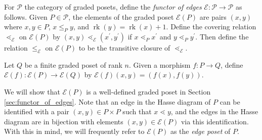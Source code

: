 \documentclass[smallextended, envcountsame, numbook]{svjour3}
\numberwithin{equation}{section}
\newcommand\rk{\operatorname{rk}}
\begin{document}
\begin{definition}
\label{defn:functor_of_edges}
For $\mathcal P$ the category of graded posets, define the {\it functor of edges} $\mathcal{E}\colon\mathcal{P} \rightarrow \mathcal{P}$ as follows. Given $P \in \mathcal P$, the elements of the graded poset $\mathcal{E}(P)$ are pairs $(x, y)$ where $x,y\in P$, $x\le_P y$, and $\rk(y) = \rk(x) + 1$. Define the covering relation $\lessdot_{\mathcal{E}}$ on $\mathcal{E}(P)$ by $(x, y) \lessdot_{\mathcal{E}} (x^\prime, y^\prime)$ if $x\lessdot_P x^\prime$ and $y\lessdot_P y^\prime$. Then define the relation $\le_{\mathcal{E}}$ on $\mathcal{E}(P)$ to be the transitive closure of $\lessdot_{\mathcal{E}}$.

Let $Q$ be a finite graded poset of rank $n$. Given a morphism $f\colon P\rightarrow Q$, define $\mathcal{E}(f)\colon \mathcal{E}(P)\rightarrow \mathcal{E}(Q)$ by $\mathcal{E}(f)(x,y) = (f(x), f(y))$.
\end{definition}

We will show that $\mathcal{E}(P)$ is a well-defined graded poset in Section \ref{sec:functor_of_edges}.  Note that an edge in the Hasse diagram of $P$ can be identified with a pair $(x,y)\in P\times P$ such that $x\lessdot y$, and the edges in the Hasse diagram are in bijection with elements $(x,y)\in \mathcal E(P)$ via this identification.  With this in mind, we will frequently refer to $\mathcal{E}(P)$ as the {\it edge poset} of $P$. 
\end{document}
